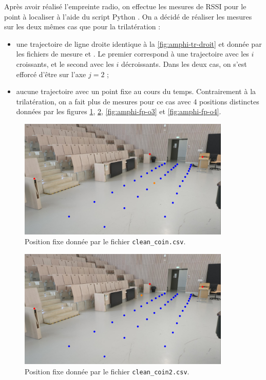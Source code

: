 \documentclass[french, a4paper, 12pt, parskip]{scrartcl}
\begin{document}
Après avoir réalisé l'empreinte radio, on effectue les mesures de RSSI pour le
point à localiser à l'aide du script Python . On a
décidé de réaliser les mesures sur les deux mêmes cas que pour la trilatération
:
\begin{itemize}
  \item une trajectoire de ligne droite identique à la
    \autoref{fig:amphi-tr-droit} et donnée par les fichiers de mesure
     et . Le premier
    correspond à une trajectoire avec les $i$ croissants, et le second avec les
    $i$ décroissants. Dans les deux cas, on s'est efforcé d'être sur l'axe
    $j=2$ ;
    \item aucune trajectoire avec un point fixe au cours du temps.
      Contrairement à la trilatération, on a fait plus de mesures pour ce cas
      avec 4 positions distinctes données par les figures
      \ref{fig:amphi-fp-o1}, \ref{fig:amphi-fp-o2}, \ref{fig:amphi-fp-o3} et
      \ref{fig:amphi-fp-o4}.
\end{itemize}

\begin{figure}[p]
    \centering
    \includegraphics[width=0.9\textwidth]{amphi-bleu-orange1.jpeg}
    \caption{Position fixe  donnée par le fichier \texttt{clean\_coin.csv}.}
    \label{fig:amphi-fp-o1}
\end{figure}

\begin{figure}[p]
    \centering
    \includegraphics[width=0.9\textwidth]{amphi-bleu-orange2.jpeg}
    \caption{Position fixe  donnée par le fichier \texttt{clean\_coin2.csv}.}
    \label{fig:amphi-fp-o2}
\end{figure}
\end{document}
